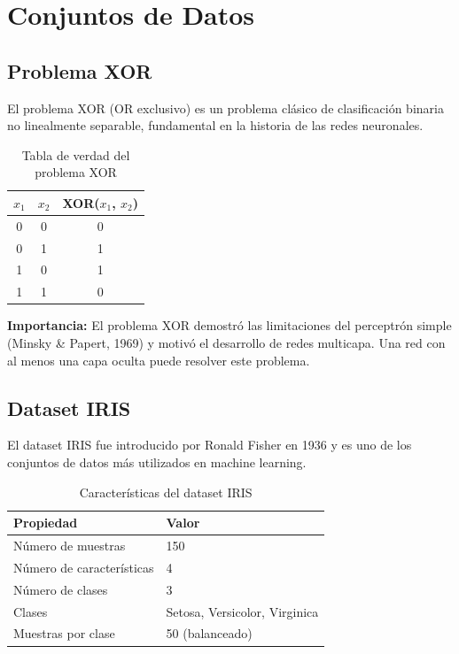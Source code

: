 \documentclass[a4paper,11pt]{article}
\begin{document}
\newpage
\section{Conjuntos de Datos}

\subsection{Problema XOR}

El problema XOR (OR exclusivo) es un problema clásico de clasificación binaria no linealmente separable, fundamental en la historia de las redes neuronales.

\begin{table}[H]
\centering
\caption{Tabla de verdad del problema XOR}
\begin{tabular}{cc|c}
\toprule
$x_1$ & $x_2$ & XOR($x_1$, $x_2$) \\
\midrule
0 & 0 & 0 \\
0 & 1 & 1 \\
1 & 0 & 1 \\
1 & 1 & 0 \\
\bottomrule
\end{tabular}
\label{tab:xor}
\end{table}

\textbf{Importancia:} El problema XOR demostró las limitaciones del perceptrón simple (Minsky \& Papert, 1969) y motivó el desarrollo de redes multicapa. Una red con al menos una capa oculta puede resolver este problema.

\subsection{Dataset IRIS}

El dataset IRIS fue introducido por Ronald Fisher en 1936 y es uno de los conjuntos de datos más utilizados en machine learning.

\begin{table}[H]
\centering
\caption{Características del dataset IRIS}
\begin{tabular}{ll}
\toprule
Propiedad & Valor \\
\midrule
Número de muestras & 150 \\
Número de características & 4 \\
Número de clases & 3 \\
Clases & Setosa, Versicolor, Virginica \\
Muestras por clase & 50 (balanceado) \\
\bottomrule
\end{tabular}
\label{tab:iris_props}
\end{table}
\end{document}
